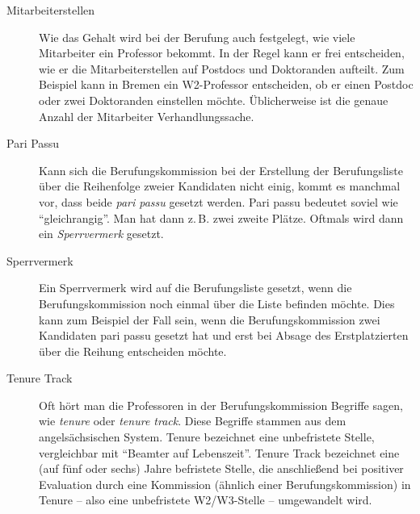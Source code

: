 \begin{description}
    \item [Mitarbeiterstellen]
          Wie das Gehalt wird bei der Berufung auch festgelegt, wie viele Mitarbeiter ein Professor bekommt.
          In der Regel kann er frei entscheiden, wie er die Mitarbeiterstellen auf Postdocs und Doktoranden
          aufteilt. Zum Beispiel kann in Bremen ein W2-Professor entscheiden, ob er einen Postdoc oder zwei
          Doktoranden einstellen möchte. Üblicherweise ist die genaue Anzahl der Mitarbeiter
          Verhandlungssache.

    \item [Pari Passu]
          Kann sich die Berufungskommission bei der Erstellung der Berufungsliste über die Reihenfolge zweier
          Kandidaten nicht einig, kommt es manchmal vor, dass beide \emph{pari passu} gesetzt werden. Pari passu
          bedeutet soviel wie "`gleichrangig"'. Man hat dann z.\,B. zwei zweite Plätze. Oftmals wird dann ein
          \emph{Sperrvermerk} gesetzt.

    \item [Sperrvermerk]
          Ein Sperrvermerk wird auf die Berufungsliste gesetzt, wenn die Berufungskommission noch einmal
          über die Liste befinden möchte. Dies kann zum Beispiel der Fall sein, wenn die Berufungskommission zwei Kandidaten
          pari passu gesetzt hat und erst bei Absage des Erstplatzierten über die Reihung entscheiden
          möchte.

    \item [Tenure Track]
          Oft hört man die Professoren in der Berufungskommission Begriffe sagen, wie \emph{tenure} oder \emph{tenure track}.
          Diese Begriffe stammen aus dem angelsächsischen System. Tenure bezeichnet eine unbefristete Stelle,
          vergleichbar mit "`Beamter auf Lebenszeit"'. Tenure Track bezeichnet eine (auf fünf oder sechs) Jahre
          befristete Stelle, die anschließend bei positiver Evaluation durch eine Kommission (ähnlich einer Berufungskommission) in Tenure -- also eine unbefristete W2/W3-Stelle -- umgewandelt wird.

\end{description}

